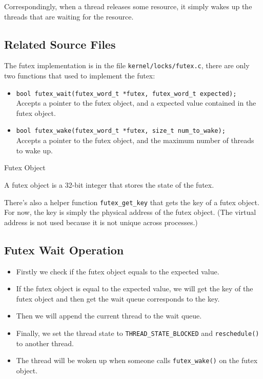 Correspondingly, when a thread releases some resource, it simply wakes up the threads
that are waiting for the resource.

\subsection{Related Source Files}

The futex implementation is in the file \texttt{kernel/locks/futex.c}, there are only
two functions that used to implement the futex:

\begin{itemize}
    \item \texttt{bool futex\_wait(futex\_word\_t *futex, futex\_word\_t expected);} \\
          Accepts a pointer to the futex object, and a expected value contained in the
          futex object.
    \item \texttt{bool futex\_wake(futex\_word\_t *futex, size\_t num\_to\_wake);} \\
          Accepts a pointer to the futex object, and the maximum number of threads to
          wake up.
\end{itemize}

\begin{note*}{Futex Object}
    \item A futex object is a 32-bit integer that stores the state of the futex.
\end{note*}

There's also a helper function \texttt{futex\_get\_key} that gets the key of a futex object.
For now, the key is simply the physical address of the futex object. (The virtual address
is not used because it is not unique across processes.)

\subsection{Futex Wait Operation}

\begin{itemize}
    \item Firstly we check if the futex object equals to the expected value.
    \item If the futex object is equal to the expected value, we will get the key of
          the futex object and then get the wait queue corresponds to the key.
    \item Then we will append the current thread to the wait queue.
    \item Finally, we set the thread state to \texttt{THREAD\_STATE\_BLOCKED} and \texttt{reschedule()}
          to another thread.
    \item The thread will be woken up when someone calls \texttt{futex\_wake()} on
          the futex object.
\end{itemize}

